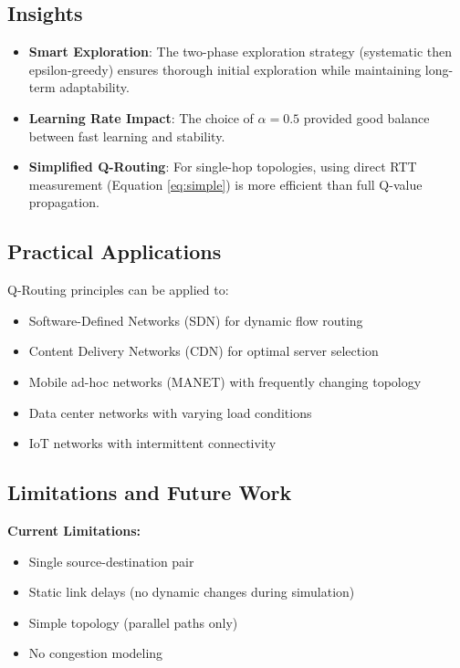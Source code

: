 \documentclass[12pt,a4paper]{article}
\begin{document}
\subsection{Insights}

\begin{itemize}
    \item \textbf{Smart Exploration}: The two-phase exploration strategy (systematic then epsilon-greedy) ensures thorough initial exploration while maintaining long-term adaptability.
    
    \item \textbf{Learning Rate Impact}: The choice of $\alpha = 0.5$ provided good balance between fast learning and stability.
    
    \item \textbf{Simplified Q-Routing}: For single-hop topologies, using direct RTT measurement (Equation \ref{eq:simple}) is more efficient than full Q-value propagation.
\end{itemize}

\subsection{Practical Applications}

Q-Routing principles can be applied to:
\begin{itemize}
    \item Software-Defined Networks (SDN) for dynamic flow routing
    \item Content Delivery Networks (CDN) for optimal server selection
    \item Mobile ad-hoc networks (MANET) with frequently changing topology
    \item Data center networks with varying load conditions
    \item IoT networks with intermittent connectivity
\end{itemize}

\subsection{Limitations and Future Work}

\textbf{Current Limitations:}
\begin{itemize}
    \item Single source-destination pair
    \item Static link delays (no dynamic changes during simulation)
    \item Simple topology (parallel paths only)
    \item No congestion modeling
\end{itemize}
\end{document}
